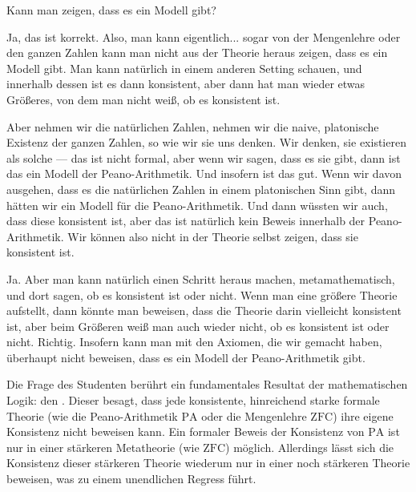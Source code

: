 \begin{student-interaction}[Studentenfrage]
Kann man zeigen, dass es ein Modell gibt?
\end{student-interaction}

\begin{spoken-clean}[continued]
Ja, das ist korrekt. Also, man kann eigentlich... sogar von der Mengenlehre oder den ganzen Zahlen kann man nicht aus der Theorie heraus zeigen, dass es ein Modell gibt. Man kann natürlich in einem anderen Setting schauen, und innerhalb dessen ist es dann konsistent, aber dann hat man wieder etwas Größeres, von dem man nicht weiß, ob es konsistent ist.

Aber nehmen wir die natürlichen Zahlen, nehmen wir die naive, platonische Existenz der ganzen Zahlen, so wie wir sie uns denken. Wir denken, sie existieren als solche --- das ist nicht formal, aber wenn wir sagen, dass es sie gibt, dann ist das ein Modell der Peano-Arithmetik. Und insofern ist das gut. Wenn wir davon ausgehen, dass es die natürlichen Zahlen in einem platonischen Sinn gibt, dann hätten wir ein Modell für die Peano-Arithmetik. Und dann wüssten wir auch, dass diese konsistent ist, aber das ist natürlich kein Beweis innerhalb der Peano-Arithmetik. Wir können also nicht in der Theorie selbst zeigen, dass sie konsistent ist.

Ja. Aber man kann natürlich einen Schritt heraus machen, metamathematisch, und dort sagen, ob es konsistent ist oder nicht. Wenn man eine größere Theorie aufstellt, dann könnte man beweisen, dass die Theorie darin vielleicht konsistent ist, aber beim Größeren weiß man auch wieder nicht, ob es konsistent ist oder nicht. Richtig. Insofern kann man mit den Axiomen, die wir gemacht haben, überhaupt nicht beweisen, dass es ein Modell der Peano-Arithmetik gibt.
\end{spoken-clean}

\begin{didactic-insight}
Die Frage des Studenten berührt ein fundamentales Resultat der mathematischen Logik: den . Dieser besagt, dass jede konsistente, hinreichend starke formale Theorie (wie die Peano-Arithmetik $\text{PA}$ oder die Mengenlehre $\text{ZFC}$) ihre eigene Konsistenz nicht beweisen kann. Ein formaler Beweis der Konsistenz von $\text{PA}$ ist nur in einer stärkeren Metatheorie (wie $\text{ZFC}$) möglich. Allerdings lässt sich die Konsistenz dieser stärkeren Theorie wiederum nur in einer noch stärkeren Theorie beweisen, was zu einem unendlichen Regress führt.
\end{didactic-insight}

